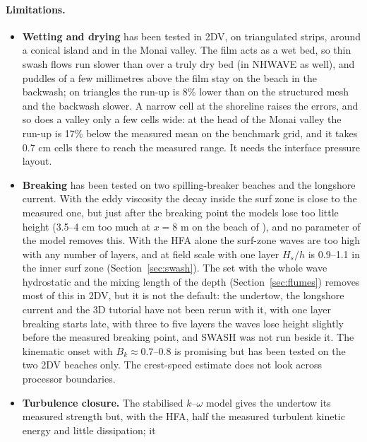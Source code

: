 \paragraph{Limitations.}
\begin{itemize}[nosep]
  \item \textbf{Wetting and drying} has been tested in 2DV, on
        triangulated strips, around a conical island and in the Monai
        valley. The film acts as a wet bed, so thin swash flows
        run slower than over a truly dry bed (in NHWAVE as well), and
        puddles of a few millimetres above the film stay on the beach in
        the backwash; on triangles the run-up is 8\% lower than on the
        structured mesh and the backwash slower. A narrow cell at the
        shoreline raises the errors, and so does a valley only a few cells
        wide: at the head of the Monai valley the run-up is 17\% below the
        measured mean on the benchmark grid, and it takes 0.7 cm cells
        there to reach the measured range. It needs the interface
        pressure layout.
  \item \textbf{Breaking} has been tested on two spilling-breaker beaches
        and the longshore current. With the eddy viscosity the decay inside
        the surf zone is close to the measured one, but just after the
        breaking point the models lose too little height (3.5--4 cm too
        much at $x = 8$ m on the beach of \citet{ting1994}), and no
        parameter of the model removes this. With the HFA alone the
        surf-zone waves are too high with any number of layers, and at
        field scale with one layer $H_s/h$ is 0.9--1.1 in the inner surf
        zone (Section~\ref{sec:swash}). The set with the whole wave
        hydrostatic and the mixing length of the depth
        (Section~\ref{sec:flumes}) removes most of this in 2DV, but it is
        not the default: the undertow, the longshore current and the 3D
        tutorial have not been rerun with it, with one layer breaking
        starts late, with three to five layers the waves lose height
        slightly before the measured breaking point, and SWASH was not run
        beside it. The kinematic onset with
        $B_k \approx 0.7$--0.8 is promising but has been tested on the two
        2DV beaches only. The crest-speed estimate does not look across
        processor boundaries.
  \item \textbf{Turbulence closure.} The stabilised $k$--$\omega$ model
        gives the undertow its measured strength but, with the HFA, half
        the measured turbulent kinetic energy and little dissipation; it

\end{itemize}
